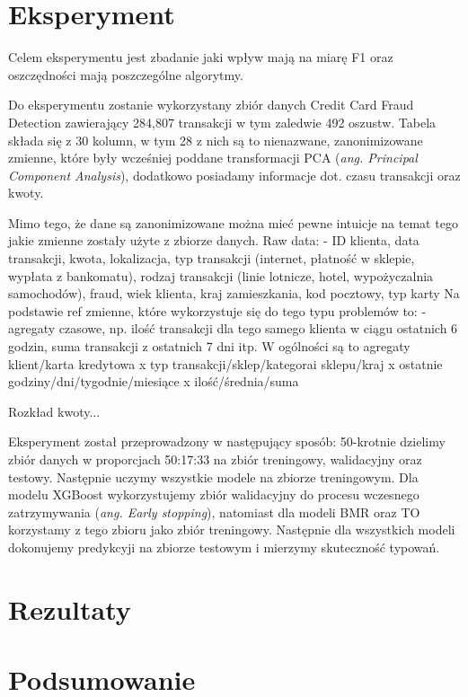 \documentclass{book}
\begin{document}
\chapter{Eksperyment}

Celem eksperymentu jest zbadanie jaki wpływ mają na miarę F1 oraz oszczędności mają poszczególne algorytmy.

Do eksperymentu zostanie wykorzystany zbiór danych Credit Card Fraud Detection zawierający 284,807 transakcji w tym zaledwie 492 oszustw. Tabela składa się z 30 kolumn, w tym 28 z nich są to nienazwane, zanonimizowane zmienne, które były wcześniej poddane transformacji PCA (\textit{ang. Principal Component Analysis}), dodatkowo posiadamy informacje dot. czasu transakcji oraz kwoty. 

Mimo tego, że dane są zanonimizowane można mieć pewne intuicje na temat tego jakie zmienne zostały użyte z zbiorze danych. 
Raw data:
- ID klienta, data transakcji, kwota, lokalizacja, typ transakcji (internet, płatność w sklepie, wypłata z bankomatu), rodzaj transakcji (linie lotnicze, hotel, wypożyczalnia samochodów), fraud, wiek klienta, kraj zamieszkania, kod pocztowy, typ karty
Na podstawie ref zmienne, które wykorzystuje się do tego typu problemów to:
- agregaty czasowe, np. ilość transakcji dla tego samego klienta w ciągu ostatnich 6 godzin, suma transakcji z ostatnich 7 dni itp.
W ogólności są to agregaty klient/karta kredytowa x typ transakcji/sklep/kategorai sklepu/kraj x ostatnie godziny/dni/tygodnie/miesiące x ilość/średnia/suma


Rozkład kwoty...

Eksperyment został przeprowadzony w następujący sposób:
50-krotnie dzielimy zbiór danych w proporcjach 50:17:33 na zbiór treningowy, walidacyjny oraz testowy. Następnie uczymy wszystkie modele na zbiorze treningowym. Dla modelu XGBoost wykorzystujemy zbiór walidacyjny do procesu wczesnego zatrzymywania (\textit{ang. Early stopping}), natomiast dla modeli BMR oraz TO korzystamy z tego zbioru jako zbiór treningowy. Następnie dla wszystkich modeli dokonujemy predykcyji na zbiorze testowym i mierzymy skuteczność typowań.

\chapter{Rezultaty}

\chapter{Podsumowanie}


\end{document}
